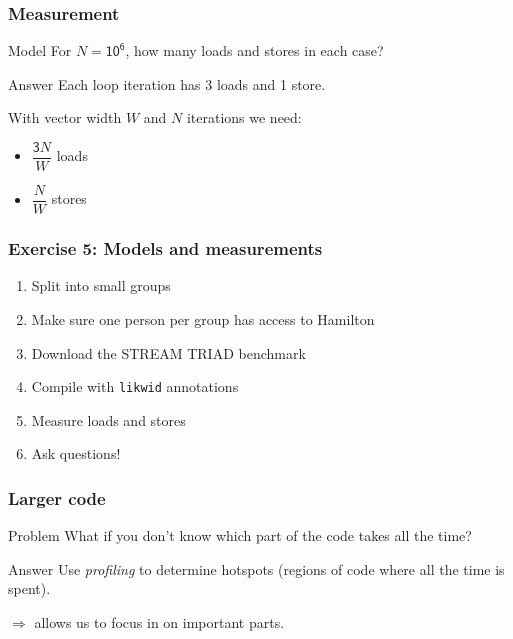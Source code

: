 \documentclass[dvipsnames,presentation,aspectratio=169,14pt]{beamer}
\begin{document}
\begin{frame}
  \frametitle{Measurement}
  \begin{challenge}{Model}
    For $N = \mathsf{10^6}$, how many loads and stores in each case?
  \end{challenge}
  \pause
  \begin{answer}{Answer}
    Each loop iteration has 3 loads and 1 store.

    With vector width $W$ and $N$ iterations we need:
    \vskip 4pt
    \begin{itemize}[itemsep=4pt]
    \item $\dfrac{\mathsf 3N}{W}$ loads
    \item $\dfrac{N}{W}$ stores
    \end{itemize}

  \end{answer}
\end{frame}

\begin{frame}[fragile]
  \frametitle{Exercise 5: Models and measurements}
  \begin{enumerate}[itemsep=8pt]
  \item Split into small groups
  \item Make sure one person per group has access to Hamilton
  \item Download the STREAM TRIAD benchmark
  \item Compile with \verb#likwid# annotations
  \item Measure loads and stores
  \item Ask questions!
  \end{enumerate}
\end{frame}

\begin{frame}
  \frametitle{Larger code}
  \begin{challenge}{Problem}
    What if you don't know which part of the code takes all the time?
  \end{challenge}
  \begin{answer}{Answer}
    Use \emph{profiling} to determine hotspots (regions of code where
    all the time is spent).

    $\Rightarrow$ allows us to focus in on important parts.
  \end{answer}
\end{frame}
\end{document}
